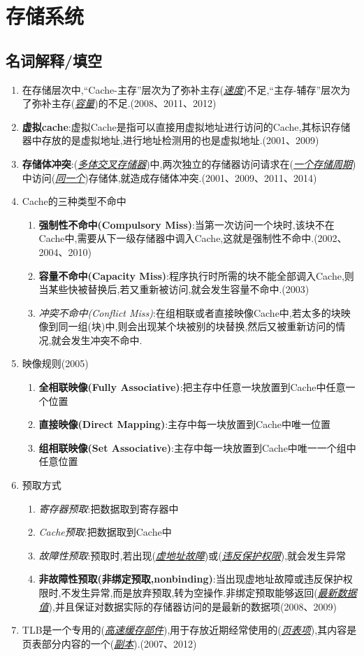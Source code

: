 \documentclass[a4paper]{ctexart}
\newcommand{\blank}[1]{(\emph{\underline{#1}})}
\begin{document}
\newpage
\section{存储系统}
\subsection{名词解释/填空}
\begin{enumerate}
  \item 在存储层次中,“Cache-主存”层次为了弥补主存\blank{速度}不足,“主存-辅存”层次为了弥补主存\blank{容量}的不足.(2008、2011、2012)
  \item \textbf{虚拟cache}:虚拟Cache是指可以直接用虚拟地址进行访问的Cache,其标识存储器中存放的是虚拟地址,进行地址检测用的也是虚拟地址.(2001、2009)
  \item \textbf{存储体冲突}:\blank{多体交叉存储器}中,两次独立的存储器访问请求在\blank{一个存储周期}中访问\blank{同一个}存储体,就造成存储体冲突.(2001、2009、2011、2014)
  \item Cache的三种类型不命中
  \begin{enumerate}
    \item \textbf{强制性不命中(Compulsory Miss)}:当第一次访问一个块时,该块不在Cache中,需要从下一级存储器中调入Cache,这就是强制性不命中.(2002、2004、2010)
    \item \textbf{容量不命中(Capacity Miss)}:程序执行时所需的块不能全部调入Cache,则当某些快被替换后,若又重新被访问,就会发生容量不命中.(2003)
    \item \emph{冲突不命中(Conflict Miss)}:在组相联或者直接映像Cache中,若太多的块映像到同一组(块)中,则会出现某个块被别的块替换,然后又被重新访问的情况,就会发生冲突不命中.
  \end{enumerate}
  \item 映像规则(2005)
  \begin{enumerate}
    \item \textbf{全相联映像(Fully Associative)}:把主存中任意一块放置到Cache中任意一个位置
    \item \textbf{直接映像(Direct Mapping)}:主存中每一块放置到Cache中唯一位置
    \item \textbf{组相联映像(Set Associative)}:主存中每一块放置到Cache中唯一一个组中任意位置
  \end{enumerate}
  \item 预取方式
  \begin{enumerate}
    \item \emph{寄存器预取}:把数据取到寄存器中
    \item \emph{Cache预取}:把数据取到Cache中
    \item \emph{故障性预取}:预取时,若出现\blank{虚地址故障}或\blank{违反保护权限},就会发生异常
    \item \textbf{非故障性预取(非绑定预取,nonbinding)}:当出现虚地址故障或违反保护权限时,不发生异常,而是放弃预取,转为空操作.非绑定预取能够返回\blank{最新数据值},并且保证对数据实际的存储器访问的是最新的数据项(2008、2009)
  \end{enumerate}
  \item TLB是一个专用的(\emph{\underline{高速缓存部件}}),用于存放近期经常使用的(\emph{\underline{页表项}}),其内容是页表部分内容的一个(\emph{\underline{副本}}).(2007、2012)
\end{enumerate}
\end{document}

